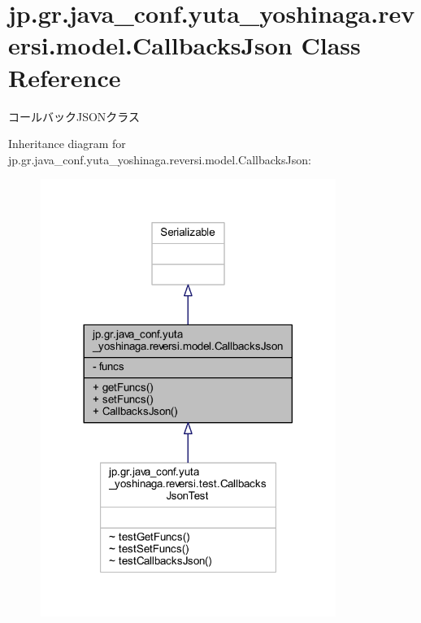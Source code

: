 \hypertarget{classjp_1_1gr_1_1java__conf_1_1yuta__yoshinaga_1_1reversi_1_1model_1_1_callbacks_json}{}\section{jp.\+gr.\+java\+\_\+conf.\+yuta\+\_\+yoshinaga.\+reversi.\+model.\+Callbacks\+Json Class Reference}
\label{classjp_1_1gr_1_1java__conf_1_1yuta__yoshinaga_1_1reversi_1_1model_1_1_callbacks_json}


コールバック\+J\+S\+O\+Nクラス  




Inheritance diagram for jp.\+gr.\+java\+\_\+conf.\+yuta\+\_\+yoshinaga.\+reversi.\+model.\+Callbacks\+Json\+:
\nopagebreak
\begin{figure}[H]
\begin{center}
\leavevmode
\includegraphics[width=272pt]{classjp_1_1gr_1_1java__conf_1_1yuta__yoshinaga_1_1reversi_1_1model_1_1_callbacks_json__inherit__graph}
\end{center}
\end{figure}


